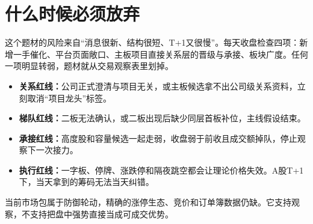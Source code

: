 \clearpage
\section{什么时候必须放弃}

这个题材的风险来自“消息很新、结构很短、T+1又很慢”。每天收盘检查四项：新增一手催化、平台页面敞口、主板项目直接关系层的晋级与承接、板块广度。任何一项明显转弱，题材就从交易观察表里划掉。

\begin{riskbox}[四条红线]
\begin{itemize}
  \item \textbf{关系红线：}公司正式澄清与项目无关，或主板候选拿不出公司级关系资料，立刻取消“项目龙头”标签。
  \item \textbf{梯队红线：}二板无法确认，或二板出现后缺少同层首板补位，主线假设结束。
  \item \textbf{承接红线：}高度股和容量候选一起走弱，收盘弱于前收且成交额掉队，停止观察下一次接力。
  \item \textbf{执行红线：}一字板、停牌、涨跌停和隔夜跳空都会让理论价格失效。A股T+1下，当天拿到的筹码无法当天纠错。
\end{itemize}
\end{riskbox}

当前市场包属于防御轮动，精确的涨停生态、竞价和订单簿数据仍缺。它支持观察，不支持把盘中强势直接当成可成交优势。
